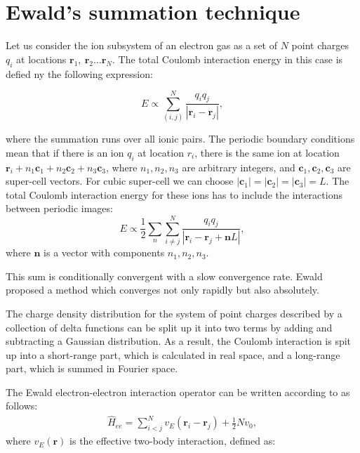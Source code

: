 \documentclass[twoside,english]{uiofysmaster}
\begin{document}
\section{Ewald's summation technique}

Let us consider the ion subsystem of an electron gas as a set of $N$
point charges $q_i$ at locations $\mathbf{r}_1,\ \mathbf{r}_2\dots
\mathbf{r}_N$. The total Coulomb interaction energy in this case is
defied ny the following expression:

\begin{equation}
E \propto \sum_{(i , j)}^N \frac{q_i q_j}{|\mathbf{r}_i-\mathbf{r}_j|},
\end{equation}  

where the summation runs over all ionic pairs. The periodic boundary
conditions mean that if there is an ion $q_i$ at location $r_i$, there
is the same ion at location $\mathbf{r}_i + n_1\mathbf{c}_1 +
n_2\mathbf{c}_2 +n_3\mathbf{c}_3$, where $n_1, n_2, n_3$ are arbitrary
integers, and $\mathbf{c}_1, \mathbf{c}_2, \mathbf{c}_3$ are
super-cell vectors.  For cubic super-cell we can choose
$|\mathbf{c}_1| = |\mathbf{c}_2| = |\mathbf{c}_3| = L$.  The total
Coulomb interaction energy for these ions has to include the
interactions between periodic images:
\begin{equation}
E \propto \frac{1}{2}\sum_n \sum_{i \neq j}^N \frac{q_i q_j}{|\mathbf{r}_i-\mathbf{r}_j + \mathbf{n}L|},
\end{equation} 
where $\mathbf{n}$ is a vector with components $n_1, n_2, n_3$.

This sum is conditionally convergent with a slow convergence
rate. Ewald proposed a method\cite{EwaldBerechnungoptischerund1921}
which converges not only rapidly but also absolutely.

The charge density distribution for the system of point charges described
by a collection of delta functions can be split up it into two terms
by adding and subtracting a Gaussian distribution. As a result, the  Coulomb
interaction is spit up into a short-range part, which is calculated in
real space, and a long-range part, which is summed in Fourier space.


The Ewald electron-electron interaction operator can be written according to \cite{EwaldBerechnungoptischerund1921} as follows:
\begin{align}
\hat{H}_{ee} = \sum_{i < j}^{N} v_{E}\left( \mathbf{r}_{i}-\mathbf{r}_{j}\right)
+ \frac{1}{2}Nv_{0},
\end{align}
where $v_{E}(\mathbf{r})$  is the effective two-body interaction, defined as:
\end{document}
